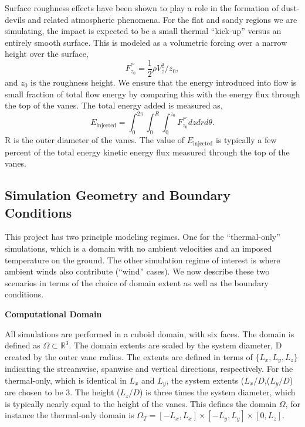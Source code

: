 Surface roughness effects have been shown to play a role in the
formation of dust-devils and related atmospheric
phenomena\cite{oke1987boundary}. For the flat and sandy regions we are
simulating, the impact is expected to be a small thermal ``kick-up''
versus an entirely smooth surface. This is modeled as a volumetric 
forcing over a narrow height over the surface, 
\begin{equation}
 F^{'''}_{z_0} = \frac{1}{2}\rho V_z^2/z_{0}, 
\end{equation}
and $z_{0}$ is the roughness height. We ensure that the energy
introduced into flow is small fraction of total flow energy by comparing
this with the energy flux through the top of the vanes. The total energy
added is measured as,  
\begin{equation}
 E_{\text{injected}} = \int_0^{2\pi} \int_0^R \int_0^{z_0} F^{'''}_{z_0} dz dr d\theta. 
\end{equation}
R is the outer diameter of the vanes. 
The value of $E_{\text{injected}}$ is typically a few percent of the
total energy kinetic energy flux measured through the top of the
vanes.


\subsection{Simulation Geometry and Boundary Conditions}
\label{sec:bc}

This project has two principle modeling regimes. One for the
``thermal-only'' simulations,  which is a domain with no ambient
velocities and an imposed temperature on the ground.  The other
simulation regime of interest is where ambient winds also contribute
(``wind'' cases). We now describe these two scenarios in terms of the
choice of domain extent as well as the boundary conditions. 

\textbf{Computational Domain} 

All simulations are performed in a cuboid domain, with six
faces.  The domain is defined as $\Omega \subset \mathbb{R}^3$. 
The domain extents are scaled by the system diameter, D created by the outer vane radius. 
The extents are defined in terms of $\{L_x,L_y,L_z\}$ indicating the 
streamwise, spanwise and vertical directions, respectively. 
For the thermal-only, which is identical in $L_x$ and $L_y$, the system extents
($L_x/D$,($L_y/D$) are chosen to be 3. The height ($L_z/D$) is three
times the system diameter, which is typically nearly equal to the height
of the vanes. This defines the domain $\Omega$, 
for instance the thermal-only domain is 
$\Omega_T = \left[-L_x,L_x \right] \times \left[-L_y,L_y \right] \times \left[0,L_z \right]$. 

